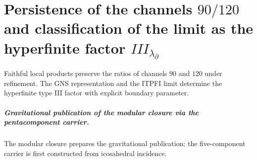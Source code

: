 \chapter{Persistence of the channels \texorpdfstring{\(90/120\)}{90/120} and classification of the limit as the hyperfinite factor \texorpdfstring{\(III_{\lambda_\partial}\)}{III(partial lambda)}}
\label{chap:parte-iv-62}

Faithful local products preserve the ratios of channels \(90\) and \(120\) under refinement. The GNS representation and the ITPFI limit determine the hyperfinite type III factor with explicit boundary parameter.



\paragraph{Gravitational publication of the modular closure via the pentacomponent carrier.} The modular closure prepares the gravitational publication: the five-component carrier is first constructed from icosahedral incidence.
